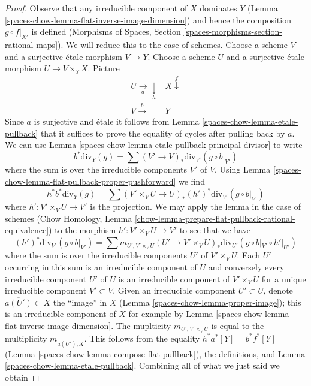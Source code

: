 \begin{proof}
Observe that any irreducible component of $X$ dominates $Y$
(Lemma \ref{spaces-chow-lemma-flat-inverse-image-dimension})
and hence the composition $g \circ f|_{X'}$ is defined
(Morphisms of Spaces, Section \ref{spaces-morphisms-section-rational-maps}).
We will reduce this to the case of schemes. Choose a scheme $V$ and a
surjective \'etale morphism $V \to Y$. Choose a scheme $U$ and a surjective
\'etale morphism $U \to V \times_Y X$. Picture
$$
\begin{array}{cc}U \underset{a}{\longrightarrow}\underset{h}{\downarrow} & X \overset{f}{\downarrow} \\ V \overset{b}{\longrightarrow} & Y\end{array}
$$
Since $a$ is surjective and \'etale it follows from
Lemma \ref{spaces-chow-lemma-etale-pullback} that it suffices to prove the
equality of cycles after pulling back by $a$.
We can use Lemma \ref{spaces-chow-lemma-etale-pullback-principal-divisor} to write
$$
b^*\text{div}_Y(g) = \sum (V' \to V)_*\text{div}_{V'}(g \circ b|_{V'})
$$
where the sum is over the irreducible components $V'$ of $V$.
Using Lemma \ref{spaces-chow-lemma-flat-pullback-proper-pushforward} we find
$$
h^*b^*\text{div}_Y(g) =
\sum (V' \times_V U \to U)_*(h')^*\text{div}_{V'}(g \circ b|_{V'})
$$
where $h' : V' \times_V U \to V'$ is the projection.
We may apply the lemma in the case of schemes
(Chow Homology, Lemma
\ref{chow-lemma-prepare-flat-pullback-rational-equivalence})
to the morphism $h' : V' \times_V U \to V'$ to see that we have
$$
(h')^*\text{div}_{V'}(g \circ b|_{V'}) =
\sum
m_{U', V' \times_V U}
(U' \to V' \times_V U)_*\text{div}_{U'}(g \circ b|_{V'} \circ h'|_{U'})
$$
where the sum is over the irreducible components $U'$ of $V' \times_V U$.
Each $U'$ occurring in this sum is an irreducible component of $U$
and conversely every irreducible component $U'$ of $U$ is an
irreducible component of $V' \times_V U$
for a unique irreducible component $V' \subset V$.
Given an irreducible component $U' \subset U$,
denote $\overline{a(U')} \subset X$ the ``image'' in $X$
(Lemma \ref{spaces-chow-lemma-proper-image}); this
is an irreducible component of $X$ for example by
Lemma \ref{spaces-chow-lemma-flat-inverse-image-dimension}.
The muplticity $m_{U', V' \times_V U}$ is equal to
the multiplicity $m_{\overline{a(U')}, X}$.
This follows from the equality $h^*a^*[Y] = b^*f^*[Y]$
(Lemma \ref{spaces-chow-lemma-compose-flat-pullback}), the definitions, and
Lemma \ref{spaces-chow-lemma-etale-pullback}.
Combining all of what we just said we obtain

\end{proof}
